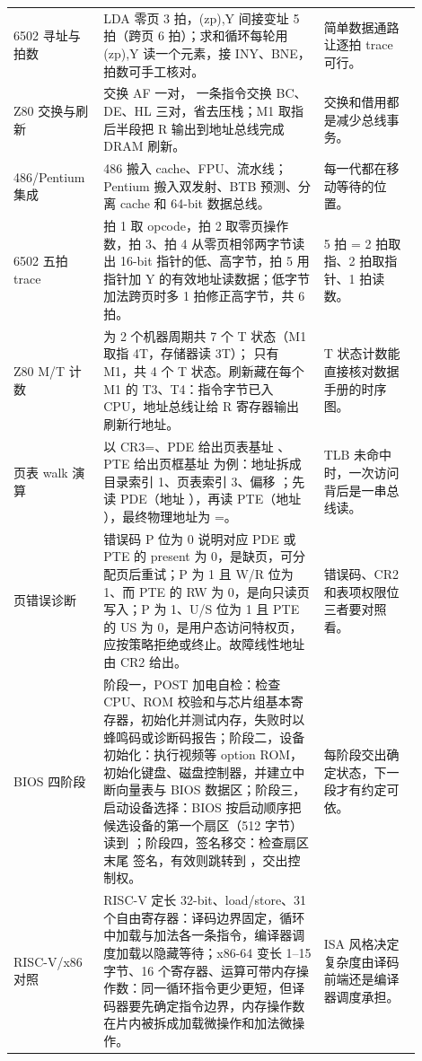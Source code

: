 \begin{longtable}{L{0.18\linewidth}L{0.5\linewidth}L{0.22\linewidth}}
6502 寻址与拍数 & LDA 零页 3 拍，(zp),Y 间接变址 5 拍（跨页 6 拍）；求和循环每轮用 (zp),Y 读一个元素，接 INY、BNE，拍数可手工核对。 & 简单数据通路让逐拍 trace 可行。 \\
Z80 交换与刷新 &  交换 AF 一对， 一条指令交换 BC、DE、HL 三对，省去压栈；M1 取指后半段把 R 输出到地址总线完成 DRAM 刷新。 & 交换和借用都是减少总线事务。 \\
486/Pentium 集成 & 486 搬入 cache、FPU、流水线；Pentium 搬入双发射、BTB 预测、分离 cache 和 64-bit 数据总线。 & 每一代都在移动等待的位置。 \\
6502 五拍 trace & 拍 1 取 opcode，拍 2 取零页操作数，拍 3、拍 4 从零页相邻两字节读出 16-bit 指针的低、高字节，拍 5 用指针加 Y 的有效地址读数据；低字节加法跨页时多 1 拍修正高字节，共 6 拍。 & 5 拍 = 2 拍取指、2 拍取指针、1 拍读数。 \\
Z80 M/T 计数 &  为 2 个机器周期共 7 个 T 状态（M1 取指 4T，存储器读 3T）； 只有 M1，共 4 个 T 状态。刷新藏在每个 M1 的 T3、T4：指令字节已入 CPU，地址总线让给 R 寄存器输出刷新行地址。 & T 状态计数能直接核对数据手册的时序图。 \\
页表 walk 演算 & 以 CR3=、PDE 给出页表基址 、PTE 给出页框基址  为例：地址拆成目录索引 1、页表索引 3、偏移 ；先读 PDE（地址 ），再读 PTE（地址 ），最终物理地址为 =。 & TLB 未命中时，一次访问背后是一串总线读。 \\
页错误诊断 & 错误码 P 位为 0 说明对应 PDE 或 PTE 的 present 为 0，是缺页，可分配页后重试；P 为 1 且 W/R 位为 1、而 PTE 的 RW 为 0，是向只读页写入；P 为 1、U/S 位为 1 且 PTE 的 US 为 0，是用户态访问特权页，应按策略拒绝或终止。故障线性地址由 CR2 给出。 & 错误码、CR2 和表项权限位三者要对照看。 \\
BIOS 四阶段 & 阶段一，POST 加电自检：检查 CPU、ROM 校验和与芯片组基本寄存器，初始化并测试内存，失败时以蜂鸣码或诊断码报告；阶段二，设备初始化：执行视频等 option ROM，初始化键盘、磁盘控制器，并建立中断向量表与 BIOS 数据区；阶段三，启动设备选择：BIOS 按启动顺序把候选设备的第一个扇区（512 字节）读到 ；阶段四，签名移交：检查扇区末尾  签名，有效则跳转到 ，交出控制权。 & 每阶段交出确定状态，下一段才有约定可依。 \\
RISC-V/x86 对照 & RISC-V 定长 32-bit、load/store、31 个自由寄存器：译码边界固定，循环中加载与加法各一条指令，编译器调度加载以隐藏等待；x86-64 变长 1--15 字节、16 个寄存器、运算可带内存操作数：同一循环指令更少更短，但译码器要先确定指令边界，内存操作数在片内被拆成加载微操作和加法微操作。 & ISA 风格决定复杂度由译码前端还是编译器调度承担。 \\
\bottomrule
\end{longtable}
